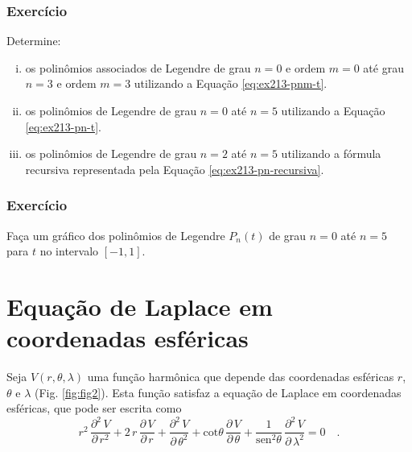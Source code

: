 \documentclass[10pt,a4paper,fleqn]{article}
\begin{document}
\subsubsection{Exerc\'{i}cio}

Determine:
\begin{enumerate}[(i)]

\item os polin\^{o}mios associados de Legendre de grau $n = 0$ e ordem $m = 0$ at\'{e} grau $n = 3$ 
e ordem $m = 3$ utilizando a Equa\c{c}ão \ref{eq:ex213-pnm-t}.

\item os polin\^{o}mios de Legendre de grau $n = 0$ at\'{e} $n = 5$ utilizando a Equa\c{c}ão 
\ref{eq:ex213-pn-t}.

\item os polin\^{o}mios de Legendre de grau $n = 2$ at\'{e} $n = 5$ utilizando a 
f\'{o}rmula recursiva representada pela Equa\c{c}\~{a}o \ref{eq:ex213-pn-recursiva}.

\end{enumerate}

\subsubsection{Exerc\'{i}cio}

Fa\c{c}a um gr\'{a}fico dos polin\^{o}mios de Legendre $P_{n}(t)$ de grau 
$n = 0$ at\'{e} $n = 5$ para $t$ no intervalo $[-1,1]$. 

\begin{flushleft}
\dotfill
\end{flushleft}

\section{Equa\c{c}\~{a}o de Laplace em coordenadas esf\'{e}ricas}

Seja $V(r,\theta,\lambda)$ uma fun\c{c}\~{a}o harm\^{o}nica que depende das coordenadas esf\'{e}ricas $r$, $\theta$ e $\lambda$ 
(Fig. \ref{fig:fig2}). Esta fun\c{c}\~{a}o satisfaz a equa\c{c}\~{a}o de Laplace em coordenadas esf\'{e}ricas, que pode ser escrita como
\begin{equation}
r^{2} \, \frac{\partial^{2} \, V}{\partial \, r^{2}} +
2 \, r \, \frac{\partial \, V}{\partial \, r} +
\frac{\partial^{2} \, V}{\partial \, \theta^{2}} +
\text{cot} \theta \, \frac{\partial \, V}{\partial \, \theta} +
\frac{1}{\text{sen}^{2} \theta} \, \frac{\partial^{2} \, V}{\partial \, \lambda^{2}} = 0 \quad .
\label{eq:ex214-eq-Laplace-esferica}
\end{equation}
\end{document}
